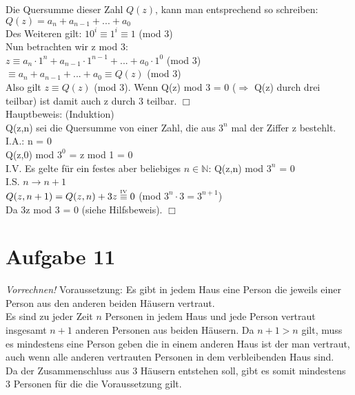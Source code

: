 \documentclass[paper = a4, ngerman]{scrartcl}
\begin{document}
Die Quersumme dieser Zahl $Q(z)$, kann man entsprechend so schreiben:\\
$Q(z) = a_n + a_{n-1} + ... + a_0$\\

Des Weiteren gilt: $10^i \equiv 1^i \equiv 1$ (mod 3)\\

Nun betrachten wir z mod 3:\\

$z \equiv a_n \cdot 1^n + a_{n-1} \cdot 1^{n-1} + ... + a_0 \cdot 1^0$ (mod 3)\\
$\equiv a_n + a_{n-1} + ... + a_0 \equiv Q(z)$ (mod 3) \\

Also gilt $z \equiv Q(z)$ (mod 3). Wenn Q(z) mod 3 = 0 ($\Rightarrow$ Q(z) durch drei teilbar) ist damit auch z durch 3 teilbar.
\hfill$\Box$\\

Hauptbeweis: (Induktion)\\

Q(z,n) sei die Quersumme von einer Zahl, die aus $3^n$ mal der Ziffer z bestehlt.\\

I.A.: n = 0\\

Q(z,0) mod $3^0$ = z mod 1 = 0 \\

I.V. Es gelte für ein festes aber beliebiges $n \in \mathbb{N}$: Q(z,n) mod $3^n$ = 0\\

I.S. $n \to n+1$\\

$Q(z, n+1) = Q(z, n) + 3z \overset{\text{\tiny{IV}}}{\equiv} 0$ (mod $3^n \cdot 3 = 3^{n+1}$) \\
Da 3z mod 3 = 0 (siehe Hilfsbeweis).
\hfill$\Box$





\pagebreak
	\section*{Aufgabe 11}
		\textit{Vorrechnen!}
		Voraussetzung: Es gibt in jedem Haus eine Person die jeweils einer Person aus den anderen beiden Häusern vertraut.\\
		Es sind zu jeder Zeit $n$ Personen in jedem Haus und jede Person vertraut insgesamt $n+1$ anderen Personen aus beiden Häusern. Da $n+1 > n$ gilt, muss es mindestens eine Person geben die in einem anderen Haus ist der man vertraut, auch wenn alle anderen vertrauten Personen in dem verbleibenden Haus sind.\\
		Da der Zusammenschluss aus 3 Häusern entstehen soll, gibt es somit mindestens 3 Personen für die die Voraussetzung gilt.
\end{document}

